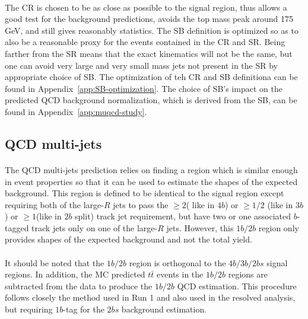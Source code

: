 \paragraph{}
The CR is chosen to be as close as possible to the signal region, thus allows a good test for the background predictions, avoids the top mass peak around 175 GeV, and still gives reasonably statistics.  The SB definition is optimized so as to also be a reasonable proxy for the events contained in the CR and SR. Being farther from the SR means that the exact kinematics will not be the same, but one can avoid very large and very small mass jets not present in the SR by appropriate choice of SB.   The optimization of teh CR and SB definitiona can be found in Appendix~\ref{app:SB-optimization}. The choice of SB's impact on the predicted QCD background normalization, which is derived from the SB, can be found in Appendix~\ref{app:muqcd-study}.


\pagebreak{}
\subsection{QCD multi-jets}
\label{sec:boosted-qcd}

\paragraph{}
The QCD multi-jets prediction relies on finding a region which is similar enough in event properties so that it can be used to estimate the shapes of the expected background. This region is defined to be identical to the signal region except requiring both of the large-$R$ jets to pass the $\geq 2$( like in $4b$) or $\geq 1/2$ (like in $3b$) or $\geq 1$(like in $2b$ split) track jet requirement, but have two or one associated $b$-tagged track jets only on one of the large-$R$ jets. However, this $1b/2b$ region only provides shapes of the expected background and not the total yield. 

\paragraph{}
It should be noted that the $1b/2b$ region is orthogonal to the $4b/3b/2bs$ signal regions. In addition, the MC predicted $t\bar{t}$ events in the $1b/2b$ regions are subtracted from the data to produce the $1b/2b$ QCD estimation. This procedure follows closely the method used in Run 1 and also used in the resolved analysis, but requiring $1b$-tag for the $2bs$ background estimation.

